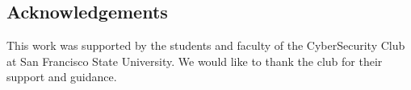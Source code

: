 \documentclass{prace}
\begin{document}
%


\subsection*{Acknowledgements}
This work was supported by the students and faculty of the CyberSecurity Club at San Francisco State University. We would like to thank the club for their support and guidance.

\end{document}
